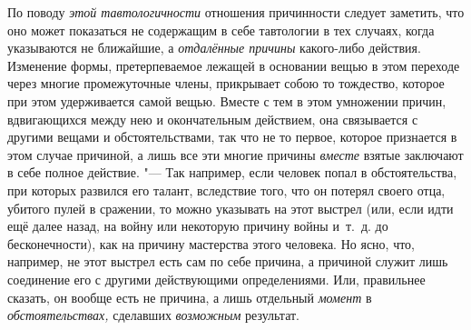 По поводу {\em этой тавтологичности} отношения причинности следует заметить,
что оно может показаться не содержащим в себе тавтологии в тех случаях, когда
указываются не ближайшие, а {\em отдалённые причины} какого-либо действия.
Изменение формы, претерпеваемое лежащей в основании вещью в этом переходе через
многие промежуточные члены, прикрывает собою то тождество, которое при этом
удерживается самой вещью. Вместе с тем в этом умножении причин, вдвигающихся
между нею и окончательным действием, она связывается с другими вещами и
обстоятельствами, так что не то первое, которое признается в этом случае
причиной, а лишь все эти многие причины {\em вместе} взятые заключают в себе
полное действие. "--- Так например, если человек попал в обстоятельства, при
которых развился его талант, вследствие того, что он потерял своего отца,
убитого пулей в сражении, то можно указывать на этот выстрел (или, если идти
ещё далее назад, на войну или некоторую причину войны и~т.~д. до
бесконечности), как на причину мастерства этого человека. Но ясно, что,
например, не этот выстрел есть сам по себе причина, а причиной служит лишь
соединение его с другими действующими определениями. Или, правильнее сказать,
он вообще есть не причина, а лишь отдельный {\em момент} в~{\em
обстоятельствах,} сделавших {\em возможным} результат.

